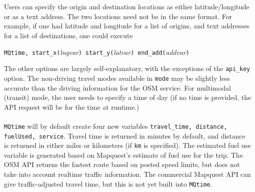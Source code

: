 \documentclass[12pt]{article}
\begin{document}
\\ \\
Users can specify the origin and destination locations as either latitude/longitude or as a text address. The two locations need not be in the same format. For example, if one had latitude and longitude for a list of origins, and text addresses for a list of destinations, one could execute
\begin{center}
\verb|MQtime, start_x(|\textit{lngvar}\verb|) start_y(|\textit{latvar}\verb|) end_add(|\textit{addvar}\verb|)|
\end{center}
The other options are largely self-explanatory, with the exceptions of the \verb|api_key| option. The non-driving travel modes available in \verb|mode| may be slightly less accurate than the driving information for the OSM service. For multimodal (transit) mode, the user needs to specify a time of day (if no time is provided, the API request will be for the time at runtime.)
\\ \\
\verb|MQtime| will by default create four new variables \verb|travel_time, distance, fuelUsed, service|. Travel time is returned in minutes by default, and distance is returned in either miles or kilometers (if \verb|km| is specified). The estimated fuel use variable is generated based on Mapquest's estimate of fuel use for the trip. The OSM API returns the fastest route based on posted speed limits, but does not take into account realtime traffic information. The commercial Mapquest API can give traffic-adjusted travel time, but this is not yet built into \verb|MQtime|.
\end{document}
